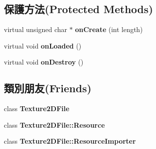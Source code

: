 \subsection*{保護方法(Protected Methods)}
\begin{DoxyCompactItemize}
\item 
virtual unsigned char $\ast$ {\bfseries on\+Create} (int length)\hypertarget{class_i_dream_sky_1_1_texture2_d_file_1_1_resource_aed376705a08c3ae316cb3b2f6b14ddb4}{}\label{class_i_dream_sky_1_1_texture2_d_file_1_1_resource_aed376705a08c3ae316cb3b2f6b14ddb4}

\item 
virtual void {\bfseries on\+Loaded} ()\hypertarget{class_i_dream_sky_1_1_texture2_d_file_1_1_resource_a1e569e356edb9f31ea6947c057216cdb}{}\label{class_i_dream_sky_1_1_texture2_d_file_1_1_resource_a1e569e356edb9f31ea6947c057216cdb}

\item 
virtual void {\bfseries on\+Destroy} ()\hypertarget{class_i_dream_sky_1_1_texture2_d_file_1_1_resource_a5524597dc7345016ed3f07db28fa6bae}{}\label{class_i_dream_sky_1_1_texture2_d_file_1_1_resource_a5524597dc7345016ed3f07db28fa6bae}

\end{DoxyCompactItemize}
\subsection*{類別朋友(Friends)}
\begin{DoxyCompactItemize}
\item 
class {\bfseries Texture2\+D\+File}\hypertarget{class_i_dream_sky_1_1_texture2_d_file_1_1_resource_a78135ffc60f8c1be32a0f49fc97f9426}{}\label{class_i_dream_sky_1_1_texture2_d_file_1_1_resource_a78135ffc60f8c1be32a0f49fc97f9426}

\item 
class {\bfseries Texture2\+D\+File\+::\+Resource}\hypertarget{class_i_dream_sky_1_1_texture2_d_file_1_1_resource_aa240389cb83e3e814688791009b71c2c}{}\label{class_i_dream_sky_1_1_texture2_d_file_1_1_resource_aa240389cb83e3e814688791009b71c2c}

\item 
class {\bfseries Texture2\+D\+File\+::\+Resource\+Importer}\hypertarget{class_i_dream_sky_1_1_texture2_d_file_1_1_resource_addc15ea48fadfdc9672288b3cb2270b9}{}\label{class_i_dream_sky_1_1_texture2_d_file_1_1_resource_addc15ea48fadfdc9672288b3cb2270b9}

\end{DoxyCompactItemize}
